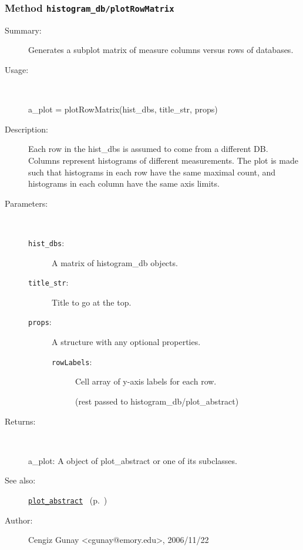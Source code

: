 \subsubsection[Method \texttt{plotRowMatrix}]{Method \texttt{histogram\_db/plotRowMatrix}}%
%
\label{ref_histogram_db__plotRowMatrix}%
\hypertarget{ref_histogram_db__plotRowMatrix}{}%
\begin{description}
\item[Summary:]Generates a subplot matrix of measure columns versus rows of databases. 
%
\item[Usage:]~%
\begin{lyxcode}%
a\_plot = plotRowMatrix(hist\_dbs, title\_str, props)
%
\end{lyxcode}%
%
\item[Description:]%
Each row in the hist\_dbs is assumed to come from a different DB. Columns represent histograms 
 of different measurements. The plot is made such that histograms in each row have the same
 maximal count, and histograms in each column have the same axis limits.
\item[Parameters:]~
\begin{description}%
\item[\texttt{hist\_dbs}:]
 A matrix of histogram\_db objects.
\item[\texttt{title\_str}:]
 Title to go at the top.
\item[\texttt{props}:]
 A structure with any optional properties.
\begin{description}%
\item[\texttt{rowLabels}:]
 Cell array of y-axis labels for each row.

(rest passed to histogram\_db/plot\_abstract)\end{description}%
\end{description}%
%
\item[Returns:]~

	a\_plot: A object of plot\_abstract or one of its subclasses.
%
%
\item[See also:]%
\hyperlink{ref_plot_abstract}{\texttt{plot\_abstract}}%
\ (p.~\pageref{ref_plot_abstract})%
%
%
\item[Author:]%
Cengiz Gunay <cgunay@emory.edu>, 2006/11/22%
\end{description}
\methodline%
